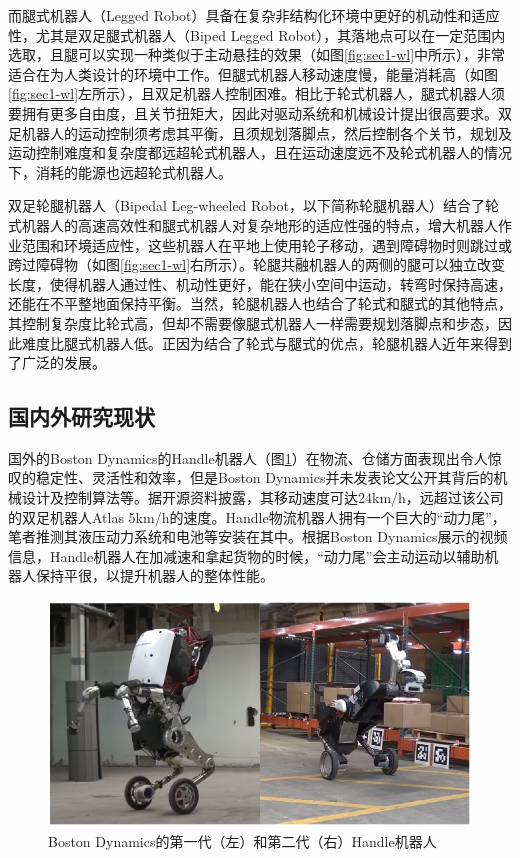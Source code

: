 而腿式机器人（Legged Robot）具备在复杂非结构化环境中更好的机动性和适应性，尤其是双足腿式机器人（Biped Legged Robot），其落地点可以在一定范围内选取，且腿可以实现一种类似于主动悬挂的效果\cite{Raibert1984walkingrobots}（如图\ref{fig:sec1-wl}中所示），非常适合在为人类设计的环境中工作\cite{Yamaguchi1997humanoid}。但腿式机器人移动速度慢，能量消耗高（如图\ref{fig:sec1-wl}左所示），且双足机器人控制困难。相比于轮式机器人，腿式机器人须要拥有更多自由度，且关节扭矩大，因此对驱动系统和机械设计提出很高要求。双足机器人的运动控制须考虑其平衡，且须规划落脚点，然后控制各个关节，规划及运动控制难度和复杂度都远超轮式机器人，且在运动速度远不及轮式机器人的情况下，消耗的能源也远超轮式机器人。

双足轮腿机器人（Bipedal Leg-wheeled Robot，以下简称轮腿机器人）结合了轮式机器人的高速高效性和腿式机器人对复杂地形的适应性强的特点，增大机器人作业范围和环境适应性，这些机器人在平地上使用轮子移动，遇到障碍物时则跳过或跨过障碍物（如图\ref{fig:sec1-wl}右所示）。轮腿共融机器人的两侧的腿可以独立改变长度，使得机器人通过性、机动性更好，能在狭小空间中运动，转弯时保持高速，还能在不平整地面保持平衡。当然，轮腿机器人也结合了轮式和腿式的其他特点，其控制复杂度比轮式高，但却不需要像腿式机器人一样需要规划落脚点和步态，因此难度比腿式机器人低。正因为结合了轮式与腿式的优点，轮腿机器人近年来得到了广泛的发展。

\subsection{国内外研究现状}

国外的Boston Dynamics的Handle机器人（图\ref{fig:sec1-Handle}）在物流、仓储方面表现出令人惊叹的稳定性、灵活性和效率，但是Boston Dynamics并未发表论文公开其背后的机械设计及控制算法等。据开源资料披露，其移动速度可达24km/h，远超过该公司的双足机器人Atlas 5km/h的速度。Handle物流机器人拥有一个巨大的“动力尾”，笔者推测其液压动力系统和电池等安装在其中。根据Boston Dynamics展示的视频信息，Handle机器人在加减速和拿起货物的时候，“动力尾”会主动运动以辅助机器人保持平很，以提升机器人的整体性能。

\begin{figure}[h!]
  \centering
  \includegraphics[width=0.5\linewidth]{figures/Sec1/Handle.png}
  \caption{
  Boston Dynamics的第一代\cite{introducinghandle}（左）和第二代\cite{handle4logistics}（右）Handle机器人
  }
  \label{fig:sec1-Handle}
   \vspace{6pt}
\end{figure}

